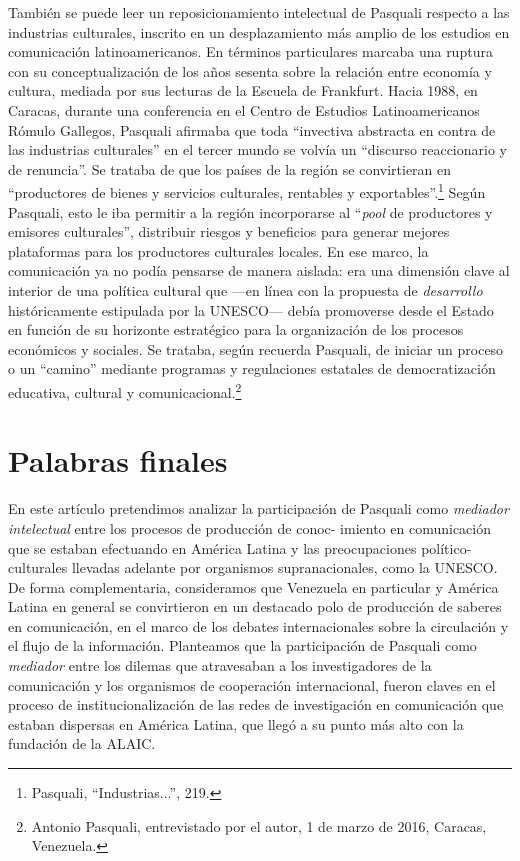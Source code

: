 \documentclass{tufte-handout}
\begin{document}
También se puede leer un reposicionamiento intelectual de Pasquali
respecto a las industrias culturales, inscrito en un desplazamiento más
amplio de los estudios en comunicación latinoamericanos. En términos
particulares marcaba una ruptura con su conceptualización de los años
sesenta sobre la relación entre economía y cultura, mediada por sus
lecturas de la Escuela de Frankfurt. Hacia 1988, en Caracas, durante una
conferencia en el Centro de Estudios Latinoamericanos Rómulo Gallegos,
Pasquali afirmaba que toda ``invectiva abstracta en contra de las
industrias culturales'' en el tercer mundo se volvía un ``discurso
reaccionario y de renuncia''. Se trataba de que los países de la región
se convirtieran en ``productores de bienes y servicios culturales,
rentables y exportables''.\footnote{Pasquali, ``Industrias...'', 219.}
Según Pasquali, esto le iba permitir a la región incorporarse al
``\emph{pool} de productores y emisores culturales'', distribuir riesgos
y beneficios para generar mejores plataformas para los productores
culturales locales. En ese marco, la comunicación ya no podía pensarse
de manera aislada: era una dimensión clave al interior de una política
cultural que ---en línea con la propuesta de \emph{desarrollo}
históricamente estipulada por la UNESCO--- debía promoverse desde el
Estado en función de su horizonte estratégico para la organización de
los procesos económicos y sociales. Se trataba, según recuerda Pasquali,
de iniciar un proceso o un ``camino'' mediante programas y regulaciones
estatales de democratización educativa, cultural y
comunicacional.\footnote{Antonio Pasquali, entrevistado por el autor, 1
  de marzo de 2016, Caracas, Venezuela.}

\hypertarget{palabras-finales}{%
\section{Palabras finales}\label{palabras-finales}}

En este artículo pretendimos analizar la participación de Pasquali como
\emph{mediador intelectual} entre los procesos de producción de
conoc- imiento en comunicación que se estaban efectuando en América Latina
y las preocupaciones político-culturales llevadas adelante por
organismos supranacionales, como la UNESCO. De forma complementaria,
consideramos que Venezuela en particular y América Latina en general se
convirtieron en un destacado polo de producción de saberes en
comunicación, en el marco de los debates internacionales sobre la
circulación y el flujo de la información. Planteamos que la
participación de Pasquali como \emph{mediador} entre los dilemas que
atravesaban a los investigadores de la comunicación y los organismos de
cooperación internacional, fueron claves en el proceso de
institucionalización de las redes de investigación en comunicación que
estaban dispersas en América Latina, que llegó a su punto más alto con
la fundación de la ALAIC.
\end{document}
